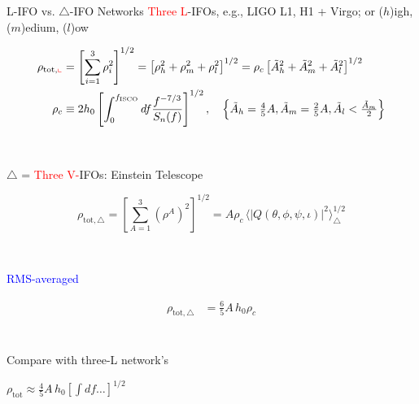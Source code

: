 \documentclass[xcolor=dvipsnames,t]{beamer}
\newcommand{\red}[1]{\textcolor{red}{#1}}
\newcommand{\bl}[1]{\textcolor{blue}{#1}}
\newcommand{\f}{\frac}
\begin{document}
\begin{frame}{L-IFO vs. $\bigtriangleup$-IFO Networks}
\red{Three L}-IFOs, e.g., LIGO L1, H1 + Virgo; or ($h$)igh, ($m$)edium, ($l$)ow
%
  \begin{footnotesize} 
  \begin{align*}
  \rho_{\text{tot},\red{\llcorner}} &= \left[{\sum_{i=1}^3 \rho^2_i}\right]^{1/2} =\left[ \rho_h^2 + \rho_m^2 + \rho^2_l \right]^{1/2} 
	  = {\rho_c\left[\tilde{A}_h^2 + \tilde{A}_m^2 + \tilde{A}_l^2 \right]^{1/2}}\\
  \rho_c &\equiv 2 h_0 \left[ \int_0^{{f_\text{ISCO}}} df \f{f^{-7/3}}{S_n(f)}  \right]^{1/2}, \quad \left\{ \tilde{A}_h = \tfrac{4}{5}A,  \tilde{A}_m =\tfrac{2}{5}A,  \tilde{A}_l  < \tfrac{\tilde{A}_m}{2}\right\}
  \end{align*}
  \end{footnotesize}
  \\
  {
    $\bigtriangleup$ = \red{Three V-}IFOs: Einstein Telescope
    \begin{footnotesize} 
    \[
    \rho_{\text{tot},\bigtriangleup} = \left[\sum_{A=1}^3 \left(\rho^A\right)^2\right]^{1/2}  =  A \rho_c \,\langle|Q(\theta,\phi,\psi,\iota)|^2\rangle^{1/2}_\bigtriangleup %
    \]
    \end{footnotesize}
    \\
  }
  \bl{RMS-averaged} %
  \begin{footnotesize}
  \begin{align*}
  \rho_{\text{tot},\bigtriangleup} %
  &=\f{6}{5}A\, h_0 \rho_c \\%
  \end{align*}
  \end{footnotesize}
  \\
  \vspace{-5mm}
  Compare with three-L network's \begin{small}$\rho_\text{tot} \approx \tfrac{4}{5}A\, h_0 \left[ \int df \ldots \right]^{1/2} $ \end{small}
  \vspace{10mm}
\end{frame}
\end{document}
